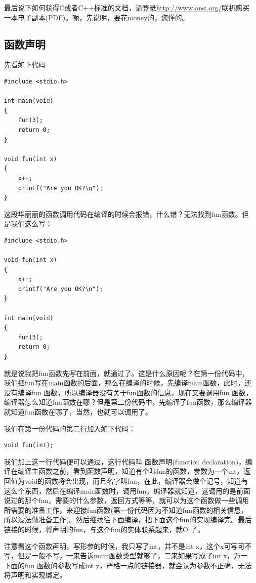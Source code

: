 \documentclass[11pt,twoside,a4paper,titlepage]{article}	%
\newcommand{\kw}[1]{\textcolor[rgb]{0.0,0.0,0.63}{ #1}}
\begin{document}
最后说下如何获得C或者C++标准的文档，请登录\url{http://www.ansi.org/}联机购买一本电子副本(PDF)。呃，先说明，要花money的，您懂的。

\subsection{函数声明}
先看如下代码

\begin{lstlisting}
#include <stdio.h>

int main(void)
{
	fun(3);
	return 0;
}

void fun(int x)
{
	x++;
	printf("Are you OK?\n");
}
\end{lstlisting}

这段华丽丽的函数调用代码在编译的时候会报错，什么错？无法找到fun函数。但是我们这么写：

\begin{lstlisting}
#include <stdio.h>

void fun(int x)
{
	x++;
	printf("Are you OK?\n");
}

int main(void)
{
	fun(3);
	return 0;
}
\end{lstlisting}

就是说我把fun函数先写在前面，就通过了。这是什么原因呢？在第一份代码中，我们把fun写在main函数的后面，那么在编译的时候，先编译main函数，此时，还没有编译fun 函数，所以编译器没有关于fun函数的信息，现在又要调用fun 函数，编译器怎么知道fun函数在哪？但是第二份代码中，先编译了fun函数，那么编译器就知道fun函数在哪了，当然，也就可以调用了。

我们在第一份代码的第二行加入如下代码：
\begin{lstlisting}
void fun(int);
\end{lstlisting}

我们加上这一行代码便可以通过，这行代码叫\kw{函数声明(function declaration)}，编译在编译主函数之前，看到函数声明，知道有个叫fun的函数，参数为一个int，返回值为void的函数将会出现，而且名字叫fun，在此，编译器会做个记号，知道有这么个东西，然后在编译main函数时，调用fun，编译器就知道，这调用的是前面说过的那个fun，需要的什么参数，返回方式等等，就可以为这个函数做一些调用所需要的准备工作，来迎接fun函数(第一份代码因为不知道fun函数的相关信息，所以没法做准备工作)。然后继续往下面编译，把下面这个fun的实现编译完。最后链接的时候，将声明的fun，与这个fun的实体联系起来，就O 了。

注意看这个函数声明，写形参的时候，我只写了int，并不是int x，这个x可写可不写，但是一般不写，一来告诉main函数类型就够了，二来如果写成了int x，万一下面的fun 函数的参数写成int y，严格一点的链接器，就会认为参数不正确，无法将声明和实现绑定。
\end{document}
